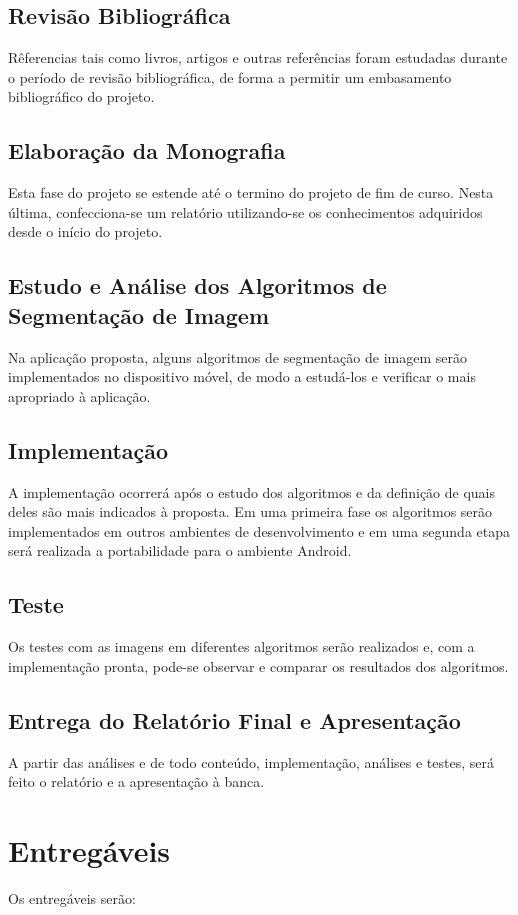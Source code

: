 \subsection{Revisão Bibliográfica}
Rêferencias tais como livros, artigos e outras referências foram estudadas durante o período de revisão bibliográfica, de forma a permitir um embasamento bibliográfico do projeto.

\subsection{Elaboração da Monografia}
Esta fase do projeto se estende até o termino do projeto de fim de curso. Nesta última, confecciona-se um relatório utilizando-se os conhecimentos adquiridos desde o início do projeto.

\subsection{Estudo e Análise dos Algoritmos de Segmentação de Imagem}
Na aplicação proposta, alguns algoritmos de segmentação de imagem serão implementados no dispositivo móvel, de modo a estudá-los e verificar o mais apropriado à aplicação.

\subsection{Implementação}
A implementação ocorrerá após o estudo dos algoritmos e da definição de quais deles são mais indicados à proposta. Em uma primeira fase os algoritmos serão implementados em outros ambientes de desenvolvimento e em uma segunda etapa será realizada a portabilidade para o ambiente Android.

\subsection{Teste}
Os testes com as imagens em diferentes algoritmos serão realizados e, com a implementação pronta, pode-se observar e comparar os resultados dos algoritmos.

\subsection{Entrega do Relatório Final e Apresentação}
A partir das análises e de todo conteúdo, implementação, análises e testes, será feito o relatório e a apresentação à banca.


\section{Entregáveis}
Os entregáveis serão:

